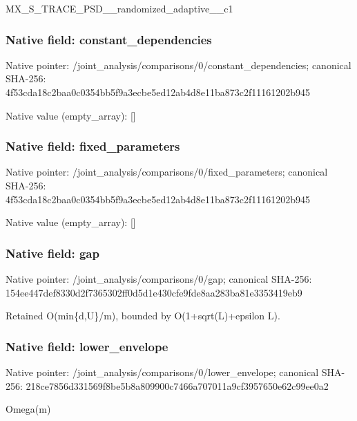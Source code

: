 \documentclass[10pt,a4paper]{article}
\begin{document}
\begingroup\raggedright\sloppy MX\_\allowbreak{}S\_\allowbreak{}TRACE\_\allowbreak{}PSD\_\allowbreak{}\_\allowbreak{}randomized\_\allowbreak{}adaptive\_\allowbreak{}\_\allowbreak{}c1\par\endgroup

\subsubsection{Native field: constant\_\allowbreak{}dependencies}
Native pointer: /joint\_\allowbreak{}analysis/comparisons/0/constant\_\allowbreak{}dependencies; canonical SHA-256: 4f53cda18c2baa0c0354bb5f9a3ecbe5ed12ab4d8e11ba873c2f11161202b945

Native value (empty\_\allowbreak{}array): []

\subsubsection{Native field: fixed\_\allowbreak{}parameters}
Native pointer: /joint\_\allowbreak{}analysis/comparisons/0/fixed\_\allowbreak{}parameters; canonical SHA-256: 4f53cda18c2baa0c0354bb5f9a3ecbe5ed12ab4d8e11ba873c2f11161202b945

Native value (empty\_\allowbreak{}array): []

\subsubsection{Native field: gap}
Native pointer: /joint\_\allowbreak{}analysis/comparisons/0/gap; canonical SHA-256: 154ee447def8330d2f7365302ff0d5d1e430cfe9fde8aa283ba81e3353419eb9

\begingroup\raggedright\sloppy Retained O(min\{d,\allowbreak{}U\}/\allowbreak{}m),\allowbreak{} bounded by O(1+sqrt(L)+epsilon L).\par\endgroup

\subsubsection{Native field: lower\_\allowbreak{}envelope}
Native pointer: /joint\_\allowbreak{}analysis/comparisons/0/lower\_\allowbreak{}envelope; canonical SHA-256: 218ce7856d331569f8be5b8a809900c7466a707011a9cf3957650e62c99ee0a2

\begingroup\raggedright\sloppy Omega(m)\par\endgroup
\end{document}
